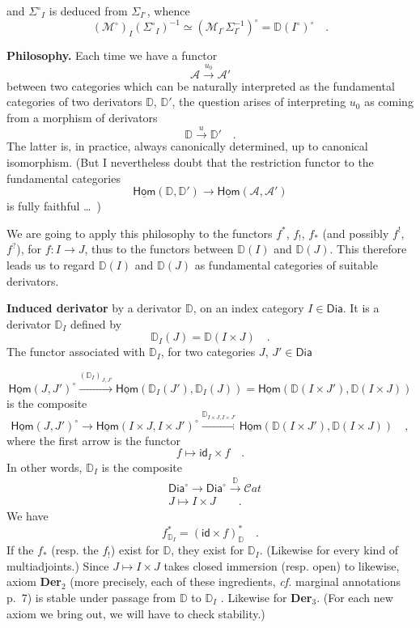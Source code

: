 \documentclass[11pt]{article}
\newcommand{\printedpage}[1]{\marginpar{\footnotesize p.~#1}}
\newcommand{\msp}[1]{\marginpar{\footnotesize [#1]}}
\newcommand{\D}{\mathbb{D}}
\newcommand{\uHom}{\underline{\mathsf{Hom}}}
\newcommand{\Dia}{\mathsf{Dia}}
\newcommand{\id}{\mathsf{id}}
\newcommand{\Cat}{\mathcal{C}at}
\begin{document}
\printedpage{14}

and $\Sigma^\circ{}_I$ is deduced from $\Sigma_{I^\circ}$, whence
\[
(\mathcal{M}^\circ)_I(\Sigma^\circ{}_I)^{-1} \simeq (\mathcal{M}_{I^\circ}\Sigma_{I^\circ}^{-1})^\circ = \D(I^\circ)^\circ \quad .
\]

\msp{page 18}

\textbf{Philosophy.} Each time we have a functor
\[
\mathcal{A} \xrightarrow{u_0} \mathcal{A}'
\]
between two categories which can be naturally interpreted as the fundamental categories of two derivators $\D$, $\D'$, the question arises of interpreting $u_0$ as coming from a morphism of derivators
\[
\D \xrightarrow{u} \D' \quad .
\]
The latter is, in practice, always canonically determined, up to canonical isomorphism. (But I nevertheless doubt that the restriction functor to the fundamental categories
\[
\uHom(\D,\D') \longrightarrow \uHom(\mathcal{A},\mathcal{A}')
\]
is fully faithful \dots\ )

We are going to apply this philosophy to the functors $f^*$, $f_!$, $f_*$ (and possibly $f^!$, $f^?$), for $f : I \to J$, thus to the functors between $\D(I)$ and $\D(J)$. This therefore leads us to regard $\D(I)$ and $\D(J)$ as fundamental categories of suitable derivators.

\textbf{Induced derivator} by a derivator $\D$, on an index category $I \in \Dia$. It is a derivator $\D_I$ defined by
\[
\D_I(J) = \D(I \times J) \quad .
\]
The functor associated with $\D_I$, for two categories $J$, $J' \in \Dia$

\msp{page 19}
\[
\uHom(J,J')^\circ \xrightarrow{(\D_I)_{J,J'}} \uHom(\D_I(J'),\D_I(J)) = \uHom(\D(I\times J'),\D(I\times J))
\]
is the composite
\[
\uHom(J,J')^\circ \longrightarrow \uHom(I\times J, I\times J')^\circ \xrightarrow{\D_{I\times J,I\times J'}} \uHom(\D(I\times J'),\D(I\times J)) \quad ,
\]
where the first arrow is the functor
\[
f \longmapsto \id_I \times f \quad .
\]
In other words, $\D_I$ is the composite
\[
\begin{aligned}
&\Dia^\circ \longrightarrow \Dia^\circ \xrightarrow{\D} \Cat \\
&J \longmapsto I \times J \qquad .
\end{aligned}
\]
We have
\[
f^*_{\D_I} = (\id \times f)^*_{\D} \quad .
\]
If the $f_*$ (resp. the $f_!$) exist for $\D$, they exist for $\D_I$. (Likewise for every kind of multiadjoints.) Since $J \mapsto I \times J$ takes closed immersion (resp. open) to likewise, axiom \textbf{Der}$_2$ (more precisely, each of these ingredients, \textit{cf.} marginal annotations p.~7) is stable under passage from $\D$ to $\D_I$ . Likewise for \textbf{Der}$_3$. (For each new axiom we bring out, we will have to check stability.)
\end{document}

